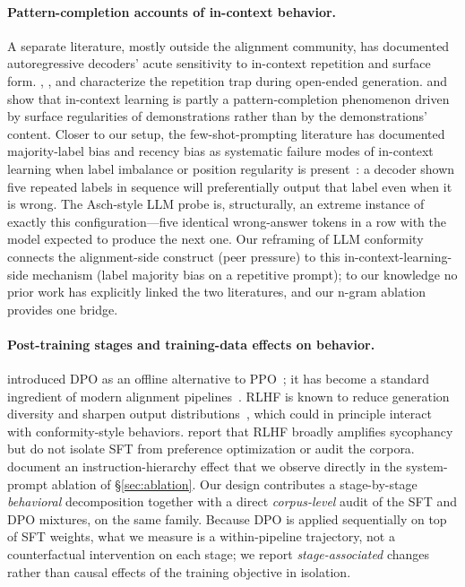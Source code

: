 \documentclass{article}
\begin{document}
\paragraph{Pattern-completion accounts of in-context behavior.}
A separate literature, mostly outside the alignment community, has documented autoregressive decoders' acute sensitivity to in-context repetition and surface form. \citet{holtzman2020curious}, \citet{welleck2020unlikelihood}, and \citet{fu2021theoretical} characterize the repetition trap during open-ended generation. \citet{min2022rethinking} and \citet{shi2023large} show that in-context learning is partly a pattern-completion phenomenon driven by surface regularities of demonstrations rather than by the demonstrations' content. Closer to our setup, the few-shot-prompting literature has documented majority-label bias and recency bias as systematic failure modes of in-context learning when label imbalance or position regularity is present~\citep{zhao2021calibrate, lu2022fantastically}: a decoder shown five repeated labels in sequence will preferentially output that label even when it is wrong. The Asch-style LLM probe is, structurally, an extreme instance of exactly this configuration---five identical wrong-answer tokens in a row with the model expected to produce the next one. Our reframing of LLM conformity connects the alignment-side construct (peer pressure) to this in-context-learning-side mechanism (label majority bias on a repetitive prompt); to our knowledge no prior work has explicitly linked the two literatures, and our n-gram ablation provides one bridge.

\paragraph{Post-training stages and training-data effects on behavior.}
\citet{rafailov2023dpo} introduced DPO as an offline alternative to PPO~\citep{schulman2017ppo}; it has become a standard ingredient of modern alignment pipelines~\citep{olmo3, meta2024llama3, meta2025llama4}. RLHF is known to reduce generation diversity and sharpen output distributions~\citep{rlhf_entropy}, which could in principle interact with conformity-style behaviors. \citet{sharma2024sycophancy} report that RLHF broadly amplifies sycophancy but do not isolate SFT from preference optimization or audit the corpora. \citet{wallace2024instruction} document an instruction-hierarchy effect that we observe directly in the system-prompt ablation of \S\ref{sec:ablation}. Our design contributes a stage-by-stage \emph{behavioral} decomposition together with a direct \emph{corpus-level} audit of the SFT and DPO mixtures, on the same family. Because DPO is applied sequentially on top of SFT weights, what we measure is a within-pipeline trajectory, not a counterfactual intervention on each stage; we report \emph{stage-associated} changes rather than causal effects of the training objective in isolation.
\end{document}
